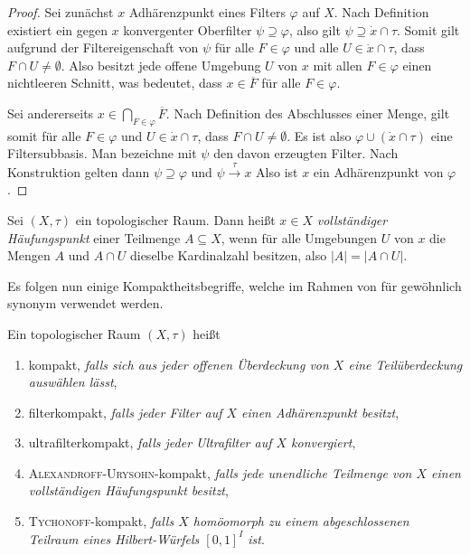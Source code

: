 \begin{proof}
  Sei zunächst $x$ Adhärenzpunkt eines Filters $\varphi$ auf $X$.
  Nach Definition existiert ein gegen $x$ konvergenter Oberfilter $\psi \supseteq \varphi$, also gilt $\psi \supseteq \dot x \cap \tau$.
  Somit gilt aufgrund der Filtereigenschaft von $\psi$ für alle $F \in \varphi$ und alle $U \in \dot x \cap \tau$, dass  $F \cap U \neq \emptyset$.
  Also besitzt jede offene Umgebung $U$ von $x$ mit allen $F \in \varphi$ einen nichtleeren Schnitt, was bedeutet, dass $x \in \overline F$ für alle $F  \in \varphi$.

  Sei andererseits $x \in \bigcap_{F \in \varphi} \overline F$.
  Nach Definition des Abschlusses einer Menge, gilt somit für alle $F \in \varphi$ und $U \in \dot x \cap \tau$, dass $F \cap U \neq \emptyset$.
  Es ist also $\varphi \cup (\dot x \cap \tau)$ eine Filtersubbasis.
  Man bezeichne mit $\psi$ den davon erzeugten Filter.
  Nach Konstruktion gelten dann $ \psi \supseteq \varphi $ und $ \psi \overset{\tau}{\to} x$
  Also ist $x$ ein Adhärenzpunkt von $\varphi$.
\end{proof}

\begin{defn}
  Sei $(X,\tau)$ ein topologischer Raum.
  Dann heißt $x \in X$ \textit{vollständiger Häufungspunkt} einer Teilmenge $A \subseteq X$, wenn für alle Umgebungen $U$ von $x$ die Mengen $A$ und $A \cap U$ dieselbe Kardinalzahl besitzen, also $|A| = | A \cap U |$.
\end{defn}

Es folgen nun einige Kompaktheitsbegriffe, welche im Rahmen von \ZFC für gewöhnlich synonym verwendet werden.
\begin{defn}
  Ein topologischer Raum $(X,\tau)$ heißt
  \begin{enumerate}[(1)]
    \item kompakt, \textit{falls sich aus jeder offenen Überdeckung von $X$ eine Teilüberdeckung auswählen lässt},
    \item filterkompakt, \textit{falls jeder Filter auf $X$ einen Adhärenzpunkt besitzt},
    \item ultrafilterkompakt, \textit{falls jeder Ultrafilter auf $X$ konvergiert},
    \item \textsc{Alexandroff}-\textsc{Urysohn}-kompakt, \textit{falls jede unendliche Teilmenge von $X$ einen vollständigen Häufungspunkt besitzt},
    \item \textsc{Tychonoff}-kompakt, \textit{falls $X$ homöomorph zu einem abgeschlossenen Teilraum eines Hilbert-Würfels $[0,1]^I$ ist}.
  \end{enumerate}
\end{defn}

